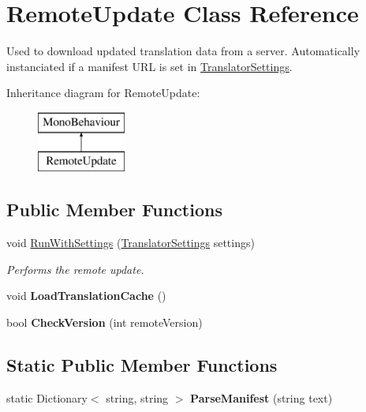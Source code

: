 \hypertarget{class_remote_update}{}\section{Remote\+Update Class Reference}
\label{class_remote_update}


Used to download updated translation data from a server. Automatically instanciated if a manifest U\+RL is set in \hyperlink{class_translator_settings}{Translator\+Settings}. 


Inheritance diagram for Remote\+Update\+:\begin{figure}[H]
\begin{center}
\leavevmode
\includegraphics[height=2.000000cm]{class_remote_update}
\end{center}
\end{figure}
\subsection*{Public Member Functions}
\begin{DoxyCompactItemize}
\item 
void \hyperlink{class_remote_update_a13352af6adc4415cfc962f08fa1fc667}{Run\+With\+Settings} (\hyperlink{class_translator_settings}{Translator\+Settings} settings)
\begin{DoxyCompactList}\small\item\em Performs the remote update.\end{DoxyCompactList}\item 
void {\bfseries Load\+Translation\+Cache} ()\hypertarget{class_remote_update_ab77c232b5e41c0cb25d21ba49a9f9c65}{}\label{class_remote_update_ab77c232b5e41c0cb25d21ba49a9f9c65}

\item 
bool {\bfseries Check\+Version} (int remote\+Version)\hypertarget{class_remote_update_a73b8c500cbae6b6784349cc60cfa2980}{}\label{class_remote_update_a73b8c500cbae6b6784349cc60cfa2980}

\end{DoxyCompactItemize}
\subsection*{Static Public Member Functions}
\begin{DoxyCompactItemize}
\item 
static Dictionary$<$ string, string $>$ {\bfseries Parse\+Manifest} (string text)\hypertarget{class_remote_update_a9acab47ea606584caf6c3f4a65ad4a87}{}\label{class_remote_update_a9acab47ea606584caf6c3f4a65ad4a87}

\end{DoxyCompactItemize}

